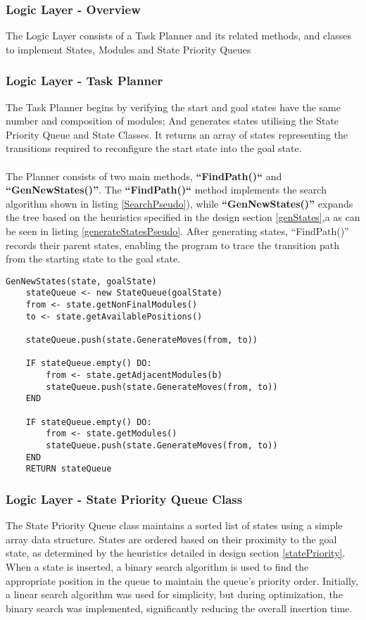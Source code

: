 \subsubsection{Logic Layer - Overview}
The Logic Layer consists of a Task Planner and its related methods, and classes to implement States, Modules and State Priority Queues

\subsubsection{Logic Layer - Task Planner}
The Task Planner begins by verifying the start and goal states have the same number and composition of modules; And generates states utilising the State Priority Queue and State Classes. It returns an array of states representing the transitions required to reconfigure the start state into the goal state.
\\\\
The Planner consists of two main methods, \textbf{“FindPath()“} and \textbf{“GenNewStates()”}. The \textbf{“FindPath()“} method implements the search algorithm shown in listing \ref{SearchPseudo}), while \textbf{“GenNewStates()”} expands the tree based on the heuristics specified in the design section \ref{genStates},a as can be seen in listing \ref{generateStatesPseudo}. After generating states, “FindPath()” records their parent states, enabling the program to trace the transition path from the starting state to the goal state.

\begin{lstlisting}[caption={State Generation Pseudo-code},captionpos=b,label={generateStatesPseudo}]
GenNewStates(state, goalState)
	stateQueue <- new StateQueue(goalState) 
	from <- state.getNonFinalModules()
	to <- state.getAvailablePositions()
	
	stateQueue.push(state.GenerateMoves(from, to))
	
	IF stateQueue.empty() DO:
		from <- state.getAdjacentModules(b)
		stateQueue.push(state.GenerateMoves(from, to))
	END
	
	IF stateQueue.empty() DO:
		from <- state.getModules()
		stateQueue.push(state.GenerateMoves(from, to))
	END
	RETURN stateQueue
\end{lstlisting}

\subsubsection{Logic Layer - State Priority Queue Class}
The State Priority Queue class maintains a sorted list of states using a simple array data structure. States are ordered based on their proximity to the goal state, as determined by the heuristics detailed in design section \ref{statePriority}. When a state is inserted, a binary search algorithm \cite{lin2019binary} is used to find the appropriate position in the queue to maintain the queue's priority order. Initially, a linear search algorithm was used for simplicity, but during optimization, the binary search was implemented, significantly reducing the overall insertion time.

